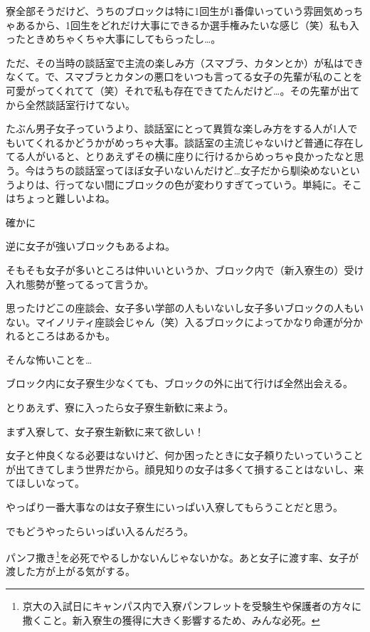 \begin{multicols}{2}
  寮全部そうだけど、うちのブロックは特に1回生が1番偉いっていう雰囲気めっちゃあるから、1回生をどれだけ大事にできるか選手権みたいな感じ（笑）私も入ったときめちゃくちゃ大事にしてもらったし…。

  ただ、その当時の談話室で主流の楽しみ方（スマブラ、カタンとか）が私はできなくて。で、スマブラとカタンの悪口をいつも言ってる女子の先輩が私のことを可愛がってくれてて（笑）それで私も存在できてたんだけど…。その先輩が出てから全然談話室行けてない。

  たぶん男子女子っていうより、談話室にとって異質な楽しみ方をする人が1人でもいてくれるかどうかがめっちゃ大事。談話室の主流じゃないけど普通に存在してる人がいると、とりあえずその横に座りに行けるからめっちゃ良かったなと思う。今はうちの談話室ってほぼ女子いないんだけど…女子だから馴染めないというよりは、行ってない間にブロックの色が変わりすぎてっていう。単純に。そこはちょっと難しいよね。

  確かに

  逆に女子が強いブロックもあるよね。

  そもそも女子が多いところは仲いいというか、ブロック内で（新入寮生の）受け入れ態勢が整ってるって言うか。

  思ったけどこの座談会、女子多い学部の人もいないし女子多いブロックの人もいない。マイノリティ座談会じゃん（笑）入るブロックによってかなり命運が分かれるところはあるかも。

  そんな怖いことを…

  ブロック内に女子寮生少なくても、ブロックの外に出て行けば全然出会える。

  とりあえず、寮に入ったら女子寮生新歓に来よう。

  まず入寮して、女子寮生新歓に来て欲しい！

  女子と仲良くなる必要はないけど、何か困ったときに女子頼りたいっていうことが出てきてしまう世界だから。顔見知りの女子は多くて損することはないし、来てほしいなって。

  やっぱり一番大事なのは女子寮生にいっぱい入寮してもらうことだと思う。

  でもどうやったらいっぱい入るんだろう。

  パンフ撒き\footnote{京大の入試日にキャンパス内で入寮パンフレットを受験生や保護者の方々に撒くこと。新入寮生の獲得に大きく影響するため、みんな必死。}を必死でやるしかないんじゃないかな。あと女子に渡す率、女子が渡した方が上がる気がする。


\end{multicols}
